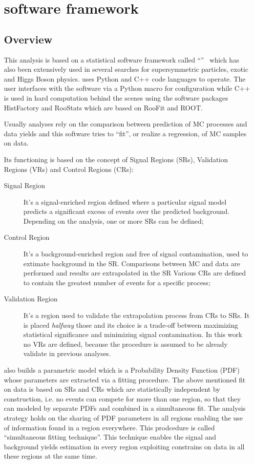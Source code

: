 \section{\hf software framework}

\subsection{Overview}
This analysis is based on a statistical software framework called ``\hf''~\cite{baak:histfitter} which has also been extensively used in several searches for supersymmetric particles, exotic and Higgs Boson physics. 
\hf uses Python and C++ code languages to operate. The user interfaces with the software via a Python macro for configuration while C++ is used in hard computation behind the scenes using the software packages HistFactory and RooStats which are based on RooFit and ROOT.

Usually analyses rely on the comparison between prediction of MC processes and data yields and this software tries to ``fit'', or realize a regression, of MC samples on data. 

Its functioning is based on the concept of Signal Regions (SRs), Validation Regions (VRs) and Control Regions (CRs):
\begin{description}
\item[Signal Region] It's a signal-enriched region defined where a particular signal model predicts a significant excess of events over the predicted background. Depending on the analysis, one or more SRs can be defined;
\item[Control Region] It's a background-enriched region and free of signal contamination, used to extimate background in the SR. Comparisons between MC and data are performed and results are extrapolated in the SR Various CRs are defined to contain the greatest number of events for a specific process;
\item[Validation Region] It's a region used to validate the extrapolation process from CRs to SRs. It is placed \emph{halfway} those and its choice is a trade-off between maximizing statistical significance and minimizing signal contamination. In this work no VRs are defined, because the procedure is assumed to be already validate in previous analyses.
\end{description}

\hf also builds a parametric model which is a Probability Density Function (PDF) whose parameters are extracted via a fitting procedure. The above mentioned fit on data is based on SRs and CRs which are statistically independent by construction, i.e. no events can compete for more than one region, so that they can modeled by separate PDFs and combined in a simultaneous fit. The \hf analysis strategy holds on the sharing of PDF parameters in all regions enabling the use of information found in a region everywhere. This prodcedure is called ``simultaneous fitting technique''. This technique enables the signal and background yields estimation in every region exploiting constrains on data in all these regions at the same time.

